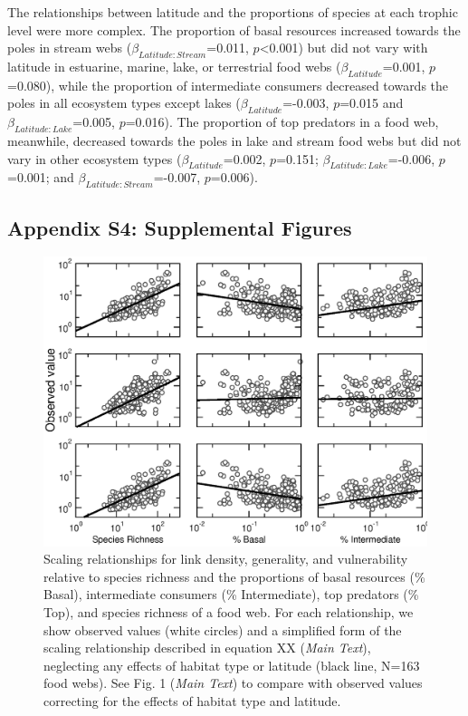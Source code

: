 \documentclass[12pt]{article}
\begin{document}
    The relationships between latitude and the proportions of species at each trophic level were more complex. 
    The proportion of basal resources increased towards the poles in stream webs ($\beta_{Latitude:Stream}$=0.011, $p$\textless0.001) 
    but did not vary with latitude in estuarine, marine, lake, or terrestrial 
    food webs ($\beta_{Latitude}$=0.001, $p$=0.080),
    while the proportion of intermediate consumers decreased towards the poles in all ecosystem types
    except lakes ($\beta_{Latitude}$=-0.003, $p$=0.015 and
    $\beta_{Latitude:Lake}$=0.005, $p$=0.016).
    The proportion of top predators in a food web, 
    meanwhile, decreased towards the poles in lake and 
    stream food webs but did not vary in other ecosystem
    types ($\beta_{Latitude}$=0.002, $p$=0.151; 
    $\beta_{Latitude:Lake}$=-0.006, $p$=0.001; and
    $\beta_{Latitude:Stream}$=-0.007, $p$=0.006).


\newpage

\subsection*{Appendix S4: Supplemental Figures}

\begin{figure}[h]
\centerline{\includegraphics*[width=.75\textwidth]{Figures/by_TL/scaling_with_S/proportions/fitlines_nonts_observed.eps}}
\caption{Scaling relationships for link density, generality, 
and vulnerability relative to species richness and the proportions of basal resources (\% Basal),
intermediate consumers (\% Intermediate), top predators (\% Top), and species richness of a food web. 
For each relationship, we show observed values (white circles) and 
a simplified form of the scaling relationship described in equation XX (\emph{Main Text}), neglecting 
any effects of habitat type or latitude (black line, N=163 food webs). See Fig. 1 (\emph{Main Text}) to compare with 
observed values correcting for the effects of habitat type and latitude. }
\label{props_v_lat_obs}
\end{figure}
\end{document}
